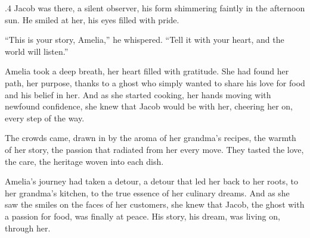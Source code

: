 \documentclass{article}
\newcommand{\baselinezs}{{\sc E2E$_{ZS}$}}
\begin{document}
\begin{tcolorbox}[colback=white, colframe=gray!30!white, coltitle=black, parskip=5mm, title=
    \textbf{System output: \baselinezs}, breakable]
\begin{spacing}{.4}
Jacob was there, a silent observer, his form shimmering faintly in the afternoon sun. He smiled at her, his eyes filled with pride. \\\par

“This is your story, Amelia,” he whispered. “Tell it with your heart, and the world will listen.” \\\par

Amelia took a deep breath, her heart filled with gratitude. She had found her path, her purpose, thanks to a ghost who simply wanted to share his love for food and his belief in her. And as she started cooking, her hands moving with newfound confidence, she knew that Jacob would be with her, cheering her on, every step of the way.  \\\par

The crowds came, drawn in by the aroma of her grandma’s recipes, the warmth of her story, the passion that radiated from her every move. They tasted the love, the care, the heritage woven into each dish.  \\\par

Amelia’s journey had taken a detour, a detour that led her back to her roots, to her grandma’s kitchen, to the true essence of her culinary dreams. And as she saw the smiles on the faces of her customers, she knew that Jacob, the ghost with a passion for food, was finally at peace. His story, his dream, was living on, through her. 
\end{spacing}
\end{tcolorbox}    
    
\end{document}
